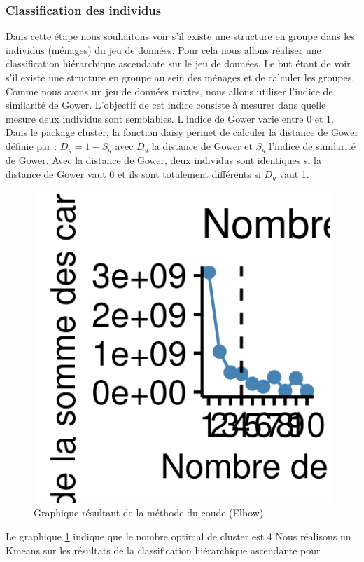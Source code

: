 \documentclass[11pt,a4paper, x11names]{article}\usepackage[]{graphicx}\usepackage[]{color}
\begin{document}
\subsubsection{Classification des individus}
Dans cette étape nous souhaitons voir s'il existe une structure en groupe dans les individus (ménages) du jeu de données.  Pour cela nous allons réaliser une classification hiérarchique ascendante sur le jeu de données.
Le but étant de voir s'il existe une structure en groupe au sein des ménages et de calculer les groupes.
Comme nous avons un jeu de données mixtes, nous allons utiliser l'indice de similarité de Gower. L’objectif de cet indice consiste à mesurer dans quelle mesure deux individus sont semblables. L’indice de Gower varie entre 0 et 1. Dans le package cluster, la fonction daisy permet de calculer la distance de Gower définie par : $D_g = 1- S_g$ avec $D_g$ la distance de Gower et $S_g$ l'indice de similarité de Gower. Avec la distance de Gower, deux individus sont identiques si la distance de Gower vaut 0 et ils sont totalement différents si $D_g$ vaut 1.
\begin{figure}[H]
\centering
\includegraphics[scale=1]{graphiques/optimal_indiv_clusters.png}
\caption{Graphique résultant de la méthode du coude (Elbow)} \label{fig10:opticlust}
\end{figure}
Le graphique \ref{fig10:opticlust} indique que le nombre optimal de cluster est 4
Nous réalisons un Kmeans sur les résultats de la classification hiérarchique ascendante pour 
\end{document}
